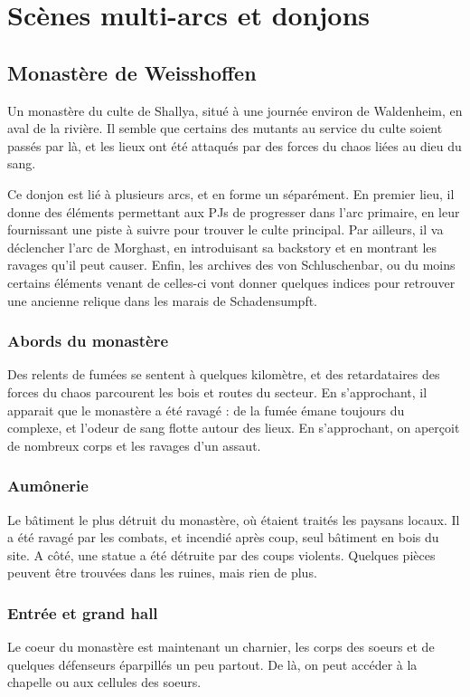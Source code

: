\documentclass[10pt,a4paper]{book}
\begin{document}
\section{Scènes multi-arcs et donjons}
\subsection{Monastère de Weisshoffen}
Un monastère du culte de Shallya, situé à une journée environ de Waldenheim, en aval de la rivière. Il semble que certains des mutants au service du culte soient passés par là, et les lieux ont été attaqués par des forces du chaos liées au dieu du sang.

Ce donjon est lié à plusieurs arcs, et en forme un séparément. En premier lieu, il donne des éléments permettant aux PJs de progresser dans l'arc primaire, en leur fournissant une piste à suivre pour trouver le culte principal. Par ailleurs, il va déclencher l'arc de Morghast, en introduisant sa backstory et en montrant les ravages qu'il peut causer. Enfin, les archives des von Schluschenbar, ou du moins certains éléments venant de celles-ci vont donner quelques indices pour retrouver une ancienne relique dans les marais de Schadensumpft.

\subsubsection{Abords du monastère}
Des relents de fumées se sentent à quelques kilomètre, et des retardataires des forces du chaos parcourent les bois et routes du secteur. En s'approchant, il apparait que le monastère a été ravagé : de la fumée émane toujours du complexe, et l'odeur de sang flotte autour des lieux. En s'approchant, on aperçoit de nombreux corps et les ravages d'un assaut.
\subsubsection{Aumônerie}
Le bâtiment le plus détruit du monastère, où étaient traités les paysans locaux. Il a été ravagé par les combats, et incendié après coup, seul bâtiment en bois du site. A côté, une statue a été détruite par des coups violents.
Quelques pièces peuvent être trouvées dans les ruines, mais rien de plus.
\subsubsection{Entrée et grand hall}
Le coeur du monastère est maintenant un charnier, les corps des soeurs et de quelques défenseurs éparpillés un peu partout. De là, on peut accéder à la chapelle ou aux cellules des soeurs.
\end{document}
